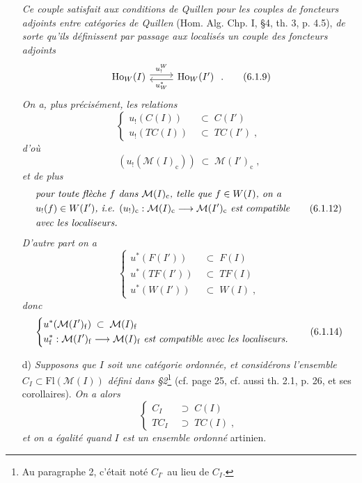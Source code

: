 \documentclass[11pt]{article}
\newcommand{\msp}[1]{\marginpar{\footnotesize [#1]}}
\newcommand{\Fl}{\mathrm{Fl}}
\begin{document}
\begin{itemize}[leftmargin=2.5em]
\msp{page 100}
\textit{Ce couple satisfait aux conditions de Quillen pour les couples de foncteurs adjoints entre catégories de Quillen} (Hom. Alg. Chp. I, §4, th. 3, p. 4.5), \textit{de sorte qu'ils définissent par passage aux localisés un couple des foncteurs adjoints}
\[
\begin{tikzcd}
\mathrm{Ho}_W(I) \arrow[r, shift left, "u_!^{W}"] & \mathrm{Ho}_W(I') \arrow[l, shift left, "u^{*}_{W}"]
\end{tikzcd}
\;.
\tag*{(6.1.9)}
\]
\textit{On a, plus précisément, les relations}
\[
\left\{
\begin{aligned}
u_!(C(I)) \;&\subset\; C(I')\\
u_!(TC(I)) \;&\subset\; TC(I')\;,
\end{aligned}
\right.
\tag*{(6.1.10)}
\]
\textit{d'où}
\[
(u_!(\mathcal{M}(I)_{\mathrm{c}})) \;\subset\; \mathcal{M}(I')_{\mathrm{c}}\;,
\tag*{(6.1.11)}
\]
\textit{et de plus}
\[
\begin{aligned}
&\text{\textit{pour toute flèche $f$ dans $\mathcal{M}(I)_{\mathrm{c}}$, telle que $f \in W(I)$, on a}}\\
&\text{\textit{$u_!(f) \in W(I')$, i.e. $(u_!)_{\mathrm{c}} : \mathcal{M}(I)_{\mathrm{c}} \longrightarrow \mathcal{M}(I')_{\mathrm{c}}$ est compatible}}\\
&\text{\textit{avec les localiseurs.}}
\end{aligned}
\tag*{(6.1.12)}
\]
\textit{D'autre part on a}
\[
\left\{
\begin{aligned}
u^{*}(F(I')) \;&\subset\; F(I)\\
u^{*}(TF(I')) \;&\subset\; TF(I)\\
u^{*}(W(I')) \;&\subset\; W(I)\;,
\end{aligned}
\right.
\tag*{(6.1.13)}
\]
\textit{donc}
\[
\left\{
\begin{aligned}
&u^{*}(\mathcal{M}(I')_{\mathrm{f}}) \;\subset\; \mathcal{M}(I)_{\mathrm{f}}\\
&u^{*}_{\mathrm{f}} : \mathcal{M}(I')_{\mathrm{f}} \longrightarrow \mathcal{M}(I)_{\mathrm{f}} \text{ \textit{est compatible avec les localiseurs.}}
\end{aligned}
\right.
\tag*{(6.1.14)}
\]

\msp{page 101}
\item[d)] \textit{Supposons que $I$ soit une catégorie ordonnée, et considérons l'ensemble $C_I \subset \Fl(\mathcal{M}(I))$ défini dans §2}\footnote[30]{Au paragraphe 2, c'était noté $C_{I^{\circ}}$ au lieu de $C_I$.} (cf. page 25, cf. aussi th. 2.1, p. 26, et ses corollaires). \textit{On a alors}
\[
\left\{
\begin{aligned}
C_I \;&\supset\; C(I)\\
TC_I \;&\supset\; TC(I)\;,
\end{aligned}
\right.
\tag*{(6.1.15)}
\]
\textit{et on a égalité quand $I$ est un ensemble ordonné} artinien.
\end{itemize}
\end{document}
